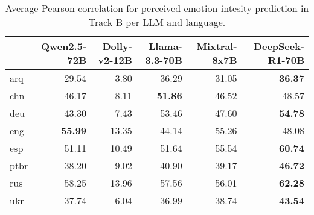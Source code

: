 \begin{table*}
\centering
\begin{tabular}{lrrrrr}
\toprule
 & Qwen2.5-72B & Dolly-v2-12B & Llama-3.3-70B & Mixtral-8x7B & DeepSeek-R1-70B \\
\midrule
arq & 29.54 & 3.80 & 36.29 & 31.05 & \textbf{36.37} \\
chn & 46.17 & 8.11 & \textbf{51.86} & 46.52 & 48.57 \\
deu & 43.30 & 7.43 & 53.46 & 47.60 & \textbf{54.78} \\
eng & \textbf{55.99} & 13.35 & 44.14 & 55.26 & 48.08 \\
esp & 51.11 & 10.49 & 51.64 & 55.54 & \textbf{60.74} \\
ptbr & 38.20 & 9.02 & 40.90 & 39.17 & \textbf{46.72} \\
rus & 58.25 & 13.96 & 57.56 & 56.01 & \textbf{62.28} \\
ukr & 37.74 & 6.04 & 36.99 & 38.74 & \textbf{43.54} \\
\bottomrule
\end{tabular}
\caption{Average Pearson correlation for perceived emotion intesity prediction in Track B per LLM and language.}
\end{table*}